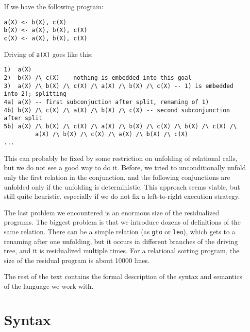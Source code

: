 \documentclass{llncs}
\begin{document}
If we have the following program: 

\begin{verbatim}
a(X) <- b(X), c(X)
b(X) <- a(X), b(X), c(X)
c(X) <- a(X), b(X), c(X)
\end{verbatim}

Driving of \verb!a(X)! goes like this: 

\begin{verbatim}
1)  a(X)
2)  b(X) /\ c(X) -- nothing is embedded into this goal
3)  a(X) /\ b(X) /\ c(X) /\ a(X) /\ b(X) /\ c(X) -- 1) is embedded into 2); splitting
4a) a(X) -- first subconjuction after split, renaming of 1)
4b) b(X) /\ c(X) /\ a(X) /\ b(X) /\ c(X) -- second subconjunction after split
5b) a(X) /\ b(X) /\ c(X) /\ a(X) /\ b(X) /\ c(X) /\ b(X) /\ c(X) /\ 
         a(X) /\ b(X) /\ c(X) /\ a(X) /\ b(X) /\ c(X) 
...
\end{verbatim}

This can probably be fixed by some restriction on unfolding of relational calls, but we do not see a good way to do it. Before, we tried to unconditionally unfold only the first relation in the conjunction, and the following conjunctions are unfolded only if the unfolding is deterministic. This approach seems viable, but still quite heuristic, especially if we do not fix a left-to-right execution strategy. 


The last problem we encountered is an enormous size of the residualized programs. The biggest problem is that we introduce dozens of definitions of the same relation. There can be a simple relation (as \verb!gto! or \verb!leo!), which gets to a renaming after one unfolding, but it occurs in different branches of the driving tree, and it is residualized multiple times. For a relational sorting program, the size of the residual program is about 10000 lines.

The rest of the text contains the formal description of the syntax and semantics of the language we work with. 

\newpage

\section{Syntax}
\end{document}
